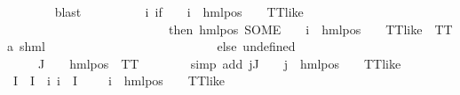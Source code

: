 \begin{isabellebody}
\ \ \ \ \ \ \isamarkupfalse%
\ blast\isanewline
\ \ \ \ \isamarkupfalse%
\ {\isasymPsi}\ \ {\isachardoublequoteopen}{\isasymPsi}\ {\isasymequiv}\ {\isacharparenleft}{\kern0pt}{\isasymlambda}i{\isachardot}{\kern0pt}\ {\isacharparenleft}{\kern0pt}if\ {\isacharparenleft}{\kern0pt}{\isasymexists}{\isasymalpha}\ {\isasymchi}{\isachardot}{\kern0pt}\ {\isasymPhi}\ i\ {\isacharequal}{\kern0pt}\ hml{\isacharunderscore}{\kern0pt}pos\ {\isasymalpha}\ {\isasymchi}\ {\isasymand}\ TT{\isacharunderscore}{\kern0pt}like\ {\isasymchi}{\isacharparenright}{\kern0pt}\isanewline
\ \ \ \ \ \ \ \ \ \ \ \ \ \ \ \ \ \ \ \ \ \ \ \ \ \ then\ {\isacharparenleft}{\kern0pt}hml{\isacharunderscore}{\kern0pt}pos\ {\isacharparenleft}{\kern0pt}SOME\ {\isasymalpha}{\isachardot}{\kern0pt}\ {\isasymexists}{\isasymchi}{\isachardot}{\kern0pt}\ {\isasymPhi}\ i\ {\isacharequal}{\kern0pt}\ hml{\isacharunderscore}{\kern0pt}pos\ {\isasymalpha}\ {\isasymchi}\ {\isasymand}\ TT{\isacharunderscore}{\kern0pt}like\ {\isasymchi}{\isacharparenright}{\kern0pt}\ TT{\isacharparenright}{\kern0pt}{\isacharcolon}{\kern0pt}{\isacharcolon}{\kern0pt}{\isacharparenleft}{\kern0pt}{\isacharprime}{\kern0pt}a{\isacharcomma}{\kern0pt}\ {\isacharprime}{\kern0pt}s{\isacharparenright}{\kern0pt}hml\ \isanewline
\ \ \ \ \ \ \ \ \ \ \ \ \ \ \ \ \ \ \ \ \ \ \ \ \ \ else\ undefined{\isacharparenright}{\kern0pt}{\isacharparenright}{\kern0pt}{\isachardoublequoteclose}\isanewline
\ \ \ \ \isamarkupfalse%
\ {\isachardoublequoteopen}{\isasymforall}{\isasympsi}\ {\isasymin}\ {\isasymPsi}\ {\isacharbackquote}{\kern0pt}\ J{\isachardot}{\kern0pt}\ {\isasymexists}{\isasymalpha}{\isachardot}{\kern0pt}\ {\isasympsi}\ {\isacharequal}{\kern0pt}\ hml{\isacharunderscore}{\kern0pt}pos\ {\isasymalpha}\ TT{\isachardoublequoteclose}\isanewline
\ \ \ \ \ \ \isamarkupfalse%
\ {\isacharparenleft}{\kern0pt}simp\ add{\isacharcolon}{\kern0pt}\ {\isacartoucheopen}{\isasymforall}j{\isasymin}J{\isachardot}{\kern0pt}\ {\isasymexists}{\isasymalpha}\ {\isasymchi}{\isachardot}{\kern0pt}\ {\isasymPhi}\ j\ {\isacharequal}{\kern0pt}\ hml{\isacharunderscore}{\kern0pt}pos\ {\isasymalpha}\ {\isasymchi}\ {\isasymand}\ TT{\isacharunderscore}{\kern0pt}like\ {\isasymchi}{\isacartoucheclose}{\isacharparenright}{\kern0pt}\isanewline
\ \ \ \ \isamarkupfalse%
\ I{\isacharprime}{\kern0pt}\ \ {\isachardoublequoteopen}I{\isacharprime}{\kern0pt}\ {\isasymequiv}\ {\isacharbraceleft}{\kern0pt}i{\isachardot}{\kern0pt}\ i\ {\isasymin}\ I\ {\isasymand}\ {\isacharparenleft}{\kern0pt}{\isacharparenleft}{\kern0pt}{\isasymexists}{\isasymalpha}\ {\isasymchi}{\isachardot}{\kern0pt}\ {\isasymPhi}\ i\ {\isacharequal}{\kern0pt}\ hml{\isacharunderscore}{\kern0pt}pos\ {\isasymalpha}\ {\isasymchi}\ {\isasymand}\ TT{\isacharunderscore}{\kern0pt}like\ {\isasymchi}{\isacharparenright}{\kern0pt}{\isacharparenright}{\kern0pt}{\isacharbraceright}{\kern0pt}{\isachardoublequoteclose}\isanewline

\end{isabellebody}

